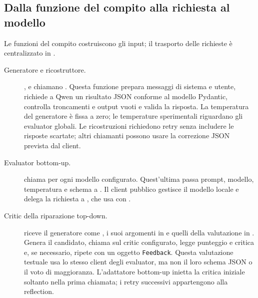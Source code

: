 \subsection{Dalla funzione del compito alla richiesta al modello}
Le funzioni del compito costruiscono gli input; il trasporto delle richieste
è centralizzato in .
\begin{description}
\item[Generatore e ricostruttore.]
,
 e
 chiamano .
Questa funzione prepara messaggi di sistema e utente, richiede a Qwen un
risultato JSON conforme al modello Pydantic, controlla troncamenti e output
vuoti e valida la risposta. La temperatura del generatore è fissa a zero;
le temperature sperimentali riguardano gli evaluator globali.
Le ricostruzioni richiedono retry senza includere le risposte scartate;
altri chiamanti possono usare la correzione JSON prevista dal client.
\item[Evaluator bottom-up.]
 chiama  per ogni
modello configurato. Quest'ultima passa prompt, modello, temperatura e schema
a . Il client pubblico gestisce il
modello locale e delega la richiesta a ,
che usa  con .
\item[Critic della riparazione top-down.]
 riceve il generatore come
, i suoi argomenti in  e quelli
della valutazione in . Genera il candidato, chiama
 sul critic configurato, legge punteggio e critica
e, se necessario, ripete con un oggetto \texttt{Feedback}. Questa valutazione
testuale usa lo stesso client degli evaluator, ma non il loro schema JSON
o il voto di maggioranza. L'adattatore bottom-up inietta la critica iniziale
soltanto nella prima chiamata; i retry successivi appartengono alla reflection.
\end{description}

